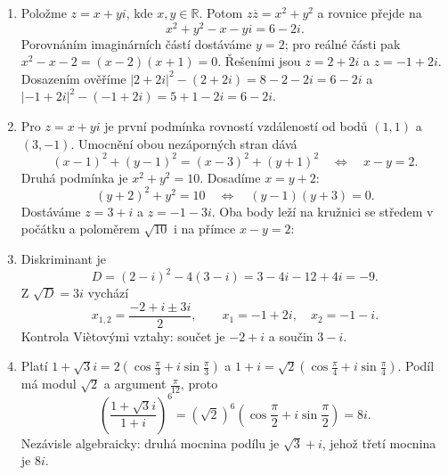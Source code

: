 \documentclass[a4paper,10pt]{article}
\begin{document}
\begin{enumerate}
\item Položme $z=x+yi$, kde $x,y\in\mathbb R$. Potom
$z\overline z=x^2+y^2$ a rovnice přejde na
\[
x^2+y^2-x-yi=6-2i.
\]
Porovnáním imaginárních částí dostáváme $y=2$;
pro reálné části pak $x^2-x-2=(x-2)(x+1)=0$.
Řešeními jsou $z=2+2i$ a $z=-1+2i$.
Dosazením ověříme
$|2+2i|^2-(2+2i)=8-2-2i=6-2i$ a
$|-1+2i|^2-(-1+2i)=5+1-2i=6-2i$.

\item Pro $z=x+yi$ je první podmínka rovností vzdáleností
od bodů $(1,1)$ a $(3,-1)$. Umocnění obou nezáporných stran dává
\[
(x-1)^2+(y-1)^2=(x-3)^2+(y+1)^2
\quad\Longleftrightarrow\quad x-y=2.
\]
Druhá podmínka je $x^2+y^2=10$. Dosadíme $x=y+2$:
\[
(y+2)^2+y^2=10
\quad\Longleftrightarrow\quad (y-1)(y+3)=0.
\]
Dostáváme $z=3+i$ a $z=-1-3i$. Oba body leží na kružnici
se středem v počátku a poloměrem $\sqrt{10}$ i na přímce $x-y=2$:
\begin{center}
\end{center}

\item Diskriminant je
\[
D=(2-i)^2-4(3-i)=3-4i-12+4i=-9.
\]
Z $\sqrt D=3i$ vychází
\[
x_{1,2}=\frac{-2+i\pm3i}{2},
\qquad x_1=-1+2i,\quad x_2=-1-i.
\]
Kontrola Viètovými vztahy: součet je $-2+i$ a součin $3-i$.

\item Platí $1+\sqrt3i=2(\cos\frac\pi3+i\sin\frac\pi3)$ a
$1+i=\sqrt2(\cos\frac\pi4+i\sin\frac\pi4)$.
Podíl má modul $\sqrt2$ a argument $\frac\pi{12}$, proto
\[
\left(\frac{1+\sqrt3i}{1+i}\right)^6
=(\sqrt2)^6\left(\cos\frac\pi2+i\sin\frac\pi2\right)=8i.
\]
Nezávisle algebraicky: druhá mocnina podílu je $\sqrt3+i$,
jehož třetí mocnina je $8i$.


\end{enumerate}
\end{document}

